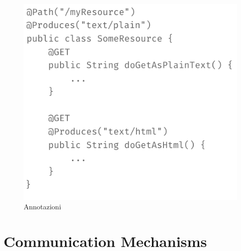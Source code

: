 \documentclass[12pt]{article}
\begin{document}
	\begin{figure}[h!]
		\centering
		\includegraphics[scale=0.40]{img/annotation1.png}
		\caption{Annotazioni}
	\end{figure} 

	   
 	
 		
 		
 		
 		
 		
 		
		
		
		
		
		
		
	
\section{Communication Mechanisms}
\end{document}
